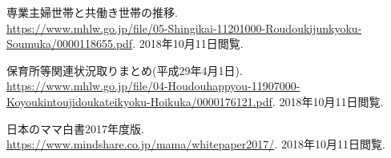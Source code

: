 \documentclass[a4j]{jarticle}
\begin{document}
\begin{thebibliography}{3}
  専業主婦世帯と共働き世帯の推移.\\
  \url{https://www.mhlw.go.jp/file/05-Shingikai-11201000-Roudoukijunkyoku-Soumuka/0000118655.pdf}.
  \newblock 2018年10月11日閲覧.

  保育所等関連状況取りまとめ(平成29年4月1日).\\
  \url{https://www.mhlw.go.jp/file/04-Houdouhappyou-11907000-Koyoukintoujidoukateikyoku-Hoikuka/0000176121.pdf}.
  \newblock 2018年10月11日閲覧.

  日本のママ白書2017年度版.\\
  \url{https://www.mindshare.co.jp/mama/whitepaper2017/}.
  \newblock 2018年10月11日閲覧.
\end{thebibliography}
\end{document}
